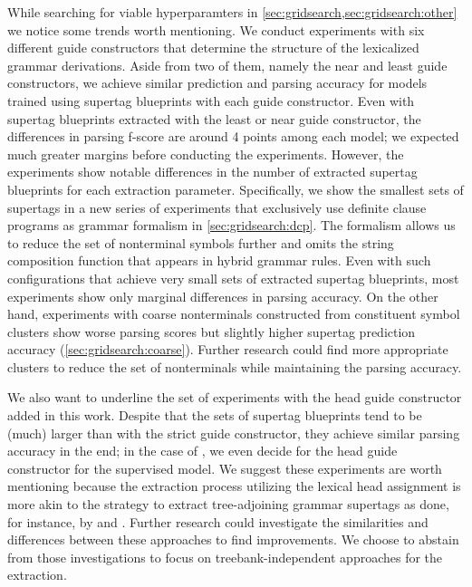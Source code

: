 \documentclass[../document.tex]{subfiles}
\begin{document}
    While searching for viable hyperparamters in \cref{sec:gridsearch,sec:gridsearch:other} we notice some trends worth mentioning.
    We conduct experiments with six different guide constructors that determine the structure of the lexicalized grammar derivations.
    Aside from two of them, namely the near and least guide constructors, we achieve similar prediction and parsing accuracy for models trained using supertag blueprints with each guide constructor.
    Even with supertag blueprints extracted with the least or near guide constructor, the differences in parsing f-score are around 4 points among each model; we expected much greater margins before conducting the experiments.
    However, the experiments show notable differences in the number of extracted supertag blueprints for each extraction parameter.
    Specifically, we show the smallest sets of supertags in a new series of experiments that exclusively use definite clause programs as grammar formalism in \cref{sec:gridsearch:dcp}.
    The formalism allows us to reduce the set of nonterminal symbols further and omits the string composition function that appears in hybrid grammar rules.
    Even with such configurations that achieve very small sets of extracted supertag blueprints, most experiments show only marginal differences in parsing accuracy.
    On the other hand, experiments with coarse nonterminals constructed from constituent symbol clusters show worse parsing scores but slightly higher supertag prediction accuracy (\cref{sec:gridsearch:coarse}).
    Further research could find more appropriate clusters to reduce the set of nonterminals while maintaining the parsing accuracy.

    We also want to underline the set of experiments with the head guide constructor added in this work.
    Despite that the sets of supertag blueprints tend to be (much) larger than with the strict guide constructor, they achieve similar parsing accuracy in the end; in the case of , we even decide for the head guide constructor for the supervised model.
    We suggest these experiments are worth mentioning because the extraction process utilizing the lexical head assignment is more akin to the strategy to extract tree-adjoining grammar supertags as done, for instance, by \citet{Kaeshammer2012GermanAE} and \citet{Bla18}.
    Further research could investigate the similarities and differences between these approaches to find improvements.
    We choose to abstain from those investigations to focus on treebank-independent approaches for the extraction.
\end{document}
